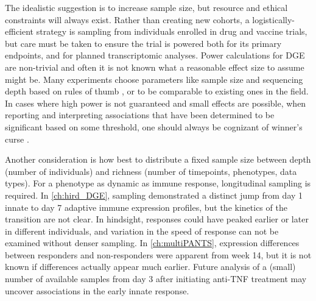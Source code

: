 The idealistic suggestion is to increase sample size, 
but resource and ethical constraints will always exist.
Rather than creating new cohorts, a logistically-efficient strategy is sampling from individuals enrolled in drug and vaccine trials,
but care must be taken to ensure the trial is powered both for its primary endpoints,
and for planned transcriptomic analyses.
Power calculations for \gls{DGE} are non-trivial and often it is not known what a reasonable effect size to assume might be.
Many experiments choose parameters like sample size and sequencing depth based on rules of thumb \autocite{conesa2016SurveyBestPractices}, or to be comparable to existing ones in the field.
In cases where high power is not guaranteed and small effects are possible,
when reporting and interpreting associations that have been determined to be significant based on some threshold, 
one should always be cognizant of winner's curse \autocite{huang2018PowerFalseDiscovery}.

Another consideration is how best to distribute a fixed sample size between depth (number of individuals) and richness (number of timepoints, phenotypes, data types).
For a phenotype as dynamic as immune response, longitudinal sampling is required.
In \cref{ch:hird_DGE}, sampling demonstrated a distinct jump from day 1 innate to day 7 adaptive immune expression profiles,
but the kinetics of the transition are not clear. 
In hindsight, responses could have peaked earlier or later in different individuals,
and variation in the speed of response can not be examined without denser sampling.
In \cref{ch:multiPANTS}, expression differences between responders and non-responders were apparent from week 14, but it is not known if differences actually appear much earlier.
Future analysis of a (small) number of available samples from day 3 after initiating anti-\gls{TNF} treatment may uncover associations in the early innate response.

